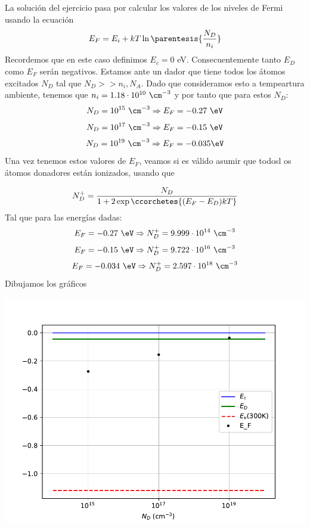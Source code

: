 	La solución del ejercicio pasa por calcular los valores de los niveles de Fermi usando la ecuación
	\begin{equation}
		E_F = E_i + kT \ln \parentesis{\frac{N_D}{n_i}}
	\end{equation}
	Recordemos que en este caso definimos $E_{c}=0$ eV. Consecuentemente tanto $E_D$ como $E_F$ serán negativos. Estamos ante un dador que tiene todos los átomos excitados $N_D$ tal que $N_D>>n_i,N_A$. Dado que consideramos esto a tempeartura ambiente, tenemos que $n_i=1.18\cdot 10^{10} \ \cm^{-3}$ y por tanto que para estos $N_D$:
	\begin{equation}
		N_D=10^{15} \ \cm^{-3} \Rightarrow E_F = -0.27 \ \eV
	\end{equation}
	\begin{equation}
		N_D=10^{17} \ \cm^{-3} \Rightarrow E_F = -0.15  \ \eV
	\end{equation}
	\begin{equation}
		N_D=10^{19} \ \cm^{-3} \Rightarrow E_F = -0.035  \eV
	\end{equation}
	Una vez tenemos estos valores de $E_F$, veamos si es válido asumir que todosl os átomos donadores están ionizados, usando que

	\begin{equation}
		N_D^+ = \frac{N_D}{1+2\exp\ccorchetes{(E_F-E_D)kT}}
	\end{equation}
	Tal que para las energías dadas:
	\begin{equation}
		E_F= -0.27  \ \eV \Rightarrow N_D^+ =  9.999\cdot 10^{14}  \ \cm^{-3}
	\end{equation}
	\begin{equation}
		E_F = -0.15 \ \eV\Rightarrow N_D^+ =  9.722\cdot 10^{16} \ \cm^{-3}
	\end{equation}
	\begin{equation}
		E_F =-0.034 \ \eV \Rightarrow N_D^+ = 2.597 \cdot 10^{18}  \ \cm^{-3}
	\end{equation}
	Dibujamos los gráficos
	\begin{center}
		\includegraphics[width=0.9\linewidth]{Cuerpo/Ch_01/Ejercicio_01_8.pdf}
	\end{center}
